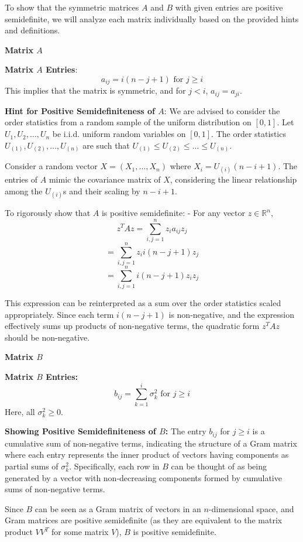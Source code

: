 \documentclass[8pt]{article}
\begin{document}
To show that the symmetric matrices \(A\) and \(B\) with given entries are positive semidefinite, we will analyze each matrix individually based on the provided hints and definitions.

\textbf{Matrix \(A\)}

\textbf{Matrix \(A\) Entries}:
\[ a_{ij} = i(n - j + 1) \text{ for } j \geq i \]
This implies that the matrix is symmetric, and for \(j < i\), \(a_{ij} = a_{ji}\).

\textbf{Hint for Positive Semidefiniteness of \(A\)}:
We are advised to consider the order statistics from a random sample of the uniform distribution on \([0, 1]\). Let \(U_1, U_2, \ldots, U_n\) be i.i.d. uniform random variables on \([0, 1]\). The order statistics \(U_{(1)}, U_{(2)}, \ldots, U_{(n)}\) are such that \(U_{(1)} \leq U_{(2)} \leq \ldots \leq U_{(n)}\).

Consider a random vector \(X = (X_1, \ldots, X_n)\) where \(X_i = U_{(i)}(n - i + 1)\). The entries of \(A\) mimic the covariance matrix of \(X\), considering the linear relationship among the \(U_{(i)}\)s and their scaling by \(n - i + 1\).

To rigorously show that \(A\) is positive semidefinite:
- For any vector \(z \in \mathbb{R}^n\),
\[ z^T A z = \sum_{i,j=1}^n z_i a_{ij} z_j \]
\[ = \sum_{i,j=1}^n z_i i(n - j + 1) z_j \]
\[ = \sum_{i,j=1}^n i(n - j + 1) z_i z_j \]

This expression can be reinterpreted as a sum over the order statistics scaled appropriately. Since each term \(i(n - j + 1)\) is non-negative, and the expression effectively sums up products of non-negative terms, the quadratic form \(z^T A z\) should be non-negative.

\textbf{Matrix \(B\)}

\textbf{ Matrix \(B\) Entries:}
\[ b_{ij} = \sum_{k=1}^i \sigma_k^2 \text{ for } j \geq i \]
Here, all \(\sigma_k^2 \geq 0\).

\textbf{Showing Positive Semidefiniteness of \(B\):}
The entry \(b_{ij}\) for \(j \geq i\) is a cumulative sum of non-negative terms, indicating the structure of a Gram matrix where each entry represents the inner product of vectors having components as partial sums of \(\sigma_k^2\). Specifically, each row in \(B\) can be thought of as being generated by a vector with non-decreasing components formed by cumulative sums of non-negative terms.

Since \(B\) can be seen as a Gram matrix of vectors in an \(n\)-dimensional space, and Gram matrices are positive semidefinite (as they are equivalent to the matrix product \(VV^T\) for some matrix \(V\)), \(B\) is positive semidefinite.
\end{document}

